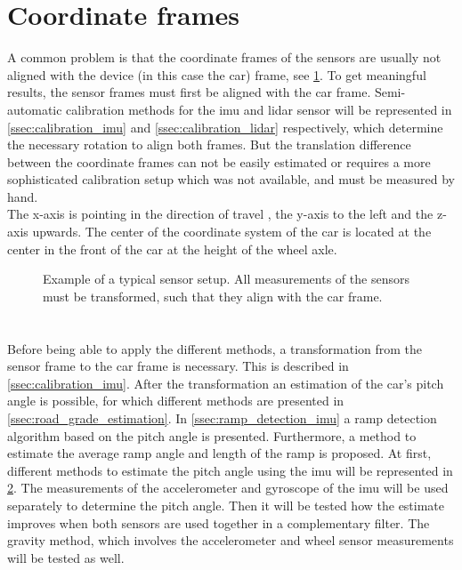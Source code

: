 \section{Coordinate frames}
\label{sec:coordinate_frames}
A common problem is that the coordinate frames of the sensors are usually not aligned with the device (in this case the car) frame, see \cref{fig:tikz_car_frames}.
To get meaningful results, the sensor frames must first be aligned with the car frame.
Semi-automatic calibration methods for the \gls{imu} and \gls{lidar} sensor will be represented in \cref{ssec:calibration_imu} and \cref{ssec:calibration_lidar} respectively, which determine the necessary rotation to align both frames.
But the translation difference between the coordinate frames can not be easily estimated or requires a more sophisticated calibration setup which was not available, and must be measured by hand.\\
The x-axis is pointing in the direction of travel , the y-axis to the left and the z-axis upwards.
The center of the coordinate system of the car is located at the center in the front of the car at the height of the wheel axle.
\begin{figure}[htb]
	\centering
	
	\caption[Sensor coordinate frames]{Example of a typical sensor setup. All measurements of the sensors must be transformed, such that they align with the car frame.}
	\label{fig:tikz_car_frames}
\end{figure}



\section{}
\label{sec:methods_imu}
Before being able to apply the different methods, a transformation from the sensor frame to the car frame is necessary.
This is described in \cref{ssec:calibration_imu}.
After the transformation an estimation of the car's pitch angle is possible, for which different methods are presented in \cref{ssec:road_grade_estimation}.
In \cref{ssec:ramp_detection_imu} a ramp detection algorithm based on the pitch angle is presented.
Furthermore, a method to estimate the average ramp angle and length of the ramp is proposed.
At first, different methods to estimate the pitch angle using the \gls{imu} will be represented in \cref{sec:methods_imu}.
The measurements of the accelerometer and gyroscope of the \gls{imu} will be used separately to determine the pitch angle.
Then it will be tested how the estimate improves when both sensors are used together in a complementary filter.
The gravity method, which involves the accelerometer and wheel sensor measurements will be tested as well.\\


